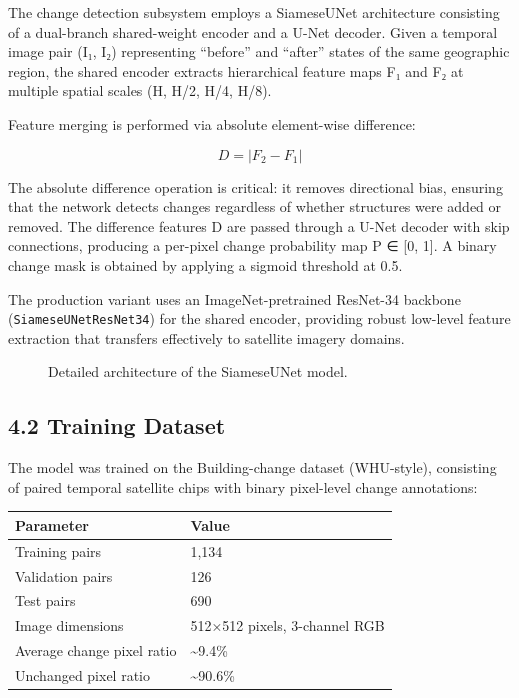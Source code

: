 \documentclass[11pt,a4paper]{article}
\begin{document}
The change detection subsystem employs a SiameseUNet architecture consisting of a dual-branch shared-weight encoder and a U-Net decoder. Given a temporal image pair (I₁, I₂) representing ``before'' and ``after'' states of the same geographic region, the shared encoder extracts hierarchical feature maps F₁ and F₂ at multiple spatial scales (H, H/2, H/4, H/8).

Feature merging is performed via absolute element-wise difference:

\[D = |F_2 - F_1| \tag{1}\]

The absolute difference operation is critical: it removes directional bias, ensuring that the network detects changes regardless of whether structures were added or removed. The difference features D are passed through a U-Net decoder with skip connections, producing a per-pixel change probability map P ∈ {[}0, 1{]}. A binary change mask is obtained by applying a sigmoid threshold at 0.5.

The production variant uses an ImageNet-pretrained ResNet-34 backbone (\texttt{SiameseUNetResNet34}) for the shared encoder, providing robust low-level feature extraction that transfers effectively to satellite imagery domains.
 
\begin{figure}[htbp]
\centering
\resizebox{0.9\columnwidth}{!}{}
\caption{Detailed architecture of the SiameseUNet model.}
\label{fig:siameseunet_arch}
\end{figure}

\hypertarget{training-dataset}{%
\subsection{4.2 Training Dataset}\label{training-dataset}}

The model was trained on the Building-change dataset (WHU-style), consisting of paired temporal satellite chips with binary pixel-level change annotations:

\begin{longtable}[]{@{}ll@{}}
\toprule\noalign{}
Parameter & Value \\
\midrule\noalign{}
\endhead
\bottomrule\noalign{}
\endlastfoot
Training pairs & 1,134 \\
Validation pairs & 126 \\
Test pairs & 690 \\
Image dimensions & 512×512 pixels, 3-channel RGB \\
Average change pixel ratio & \textasciitilde9.4\% \\
Unchanged pixel ratio & \textasciitilde90.6\% \\
\end{longtable}
\end{document}
